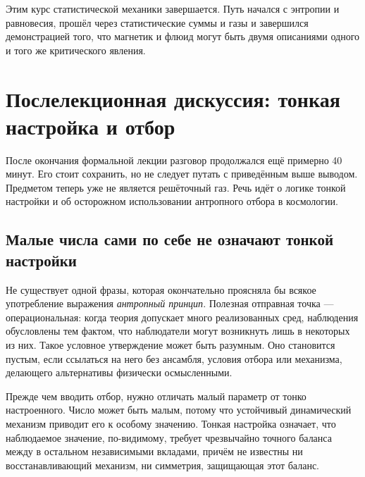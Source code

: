 \begin{classroomqa}
\end{classroomqa}

Этим курс статистической механики завершается. Путь начался с энтропии и равновесия, прошёл через статистические суммы и газы и завершился демонстрацией того, что магнетик и флюид могут быть двумя описаниями одного и того же критического явления.

\section{Послелекционная дискуссия: тонкая настройка и отбор}

После окончания формальной лекции разговор продолжался ещё примерно 40 минут. Его стоит сохранить, но не следует путать с приведённым выше выводом. Предметом теперь уже не является решёточный газ. Речь идёт о логике тонкой настройки и об осторожном использовании антропного отбора в космологии.

\subsection{Малые числа сами по себе не означают тонкой настройки}

Не существует одной фразы, которая окончательно проясняла бы всякое употребление выражения \emph{антропный принцип}. Полезная отправная точка — операциональная: когда теория допускает много реализованных сред, наблюдения обусловлены тем фактом, что наблюдатели могут возникнуть лишь в некоторых из них. Такое условное утверждение может быть разумным. Оно становится пустым, если ссылаться на него без ансамбля, условия отбора или механизма, делающего альтернативы физически осмысленными.

Прежде чем вводить отбор, нужно отличать малый параметр от тонко настроенного. Число может быть малым, потому что устойчивый динамический механизм приводит его к особому значению. Тонкая настройка означает, что наблюдаемое значение, по-видимому, требует чрезвычайно точного баланса между в остальном независимыми вкладами, причём не известны ни восстанавливающий механизм, ни симметрия, защищающая этот баланс.


